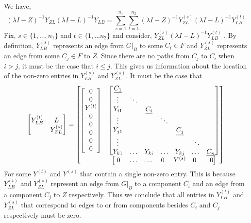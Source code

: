 \documentclass{paper}
\begin{document}
We have,
\[
(\lambda	I - \underline{Z})^{-1}Y_{ZL} (\lambda I - L)^{-1}Y_{LB}
= \sum_{s=1}^{n_1} \sum_{t=1}^{n_2} (\lambda	I - \underline{Z})^{-1}Y_{ZL}^{(s)} (\lambda I - L)^{-1}Y_{LB}^{(t)}
\]
Fix, $s \in \{1,...,n_1\}$ and $t \in \{1,...n_2\}$ and consider, $Y_{ZL}^{(s)} (\lambda I - L)^{-1}Y_{LB}^{(t)}$ . 
By definition, $Y_{LB}^{(s)}$ represents an edge from $G|_B$ to some $C_i \in F$  and $Y_{ZL}^{(s)}$ represents an edge from some $C_j \in F$ to $Z$. Since there are no paths from $C_j$ to $C_i$ when $i > j$, it must be the case that $i \leq j$. This gives us information about the location of the non-zero entries in $Y_{LB}^{(s)}$ and $Y_{ZL}^{(s)}$. It must be the case that
\[
\begin{bmatrix}
Y_{LB}^{(t)} & L \\
 &Y_{ZL}^{(s)}
\end{bmatrix}
=
\begin{bmatrix}
\begin{bmatrix}
0 \\
0 \\
Y^{(t)}\\
0 \\
0 \\
0 \\
0 \\
0 \\
\end{bmatrix}
&
\begin{bmatrix}
\underline{C_1} \\
\vdots & \ddots \\
Y_{i1} & & \underline{C_i} \\
\vdots & & & \ddots \\
Y_{j1} & & & & \underline{C_j} \\
\vdots & & & & & \ddots \\

Y_{k1} & \hdots & Y_{ki} & \hdots & Y_{kj} & \hdots & \underline{C_n} \\
\end{bmatrix}
\\
& 
\begin{bmatrix}
\, \, 0 \, \, & \hdots & \hdots & \, \, 0  & \, \, Y^{(s)} & 0 \quad & 0 
\end{bmatrix}
\end{bmatrix} \\
\]
For some $Y^{(t)}$ and $Y^{(s)}$ that contain a single non-zero entry. 
This is because $Y_{LB}^{(t)}$ and $Y_{ZL}^{(s)}$ represent an edge from $G|_B$ to a component $C_i$ and an edge from a component $C_j$ to $Z$ respectively. Thus we conclude that all entries in $Y_{LB}^{(t)}$ and $Y_{ZL}^{(s)}$ that correspond to edges to or from components besides $C_i$ and $C_j$ respectively must be zero. 
\end{document}
